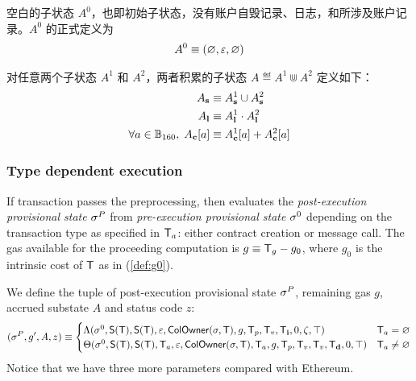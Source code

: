 空白的子状态 $A^0$，也即初始子状态，没有账户自毁记录、日志，和所涉及账户记录。$A^0$ 的正式定义为
\begin{align}
	A^0\equiv \left( \varnothing, \mathbb{\varepsilon}, \varnothing\right)
\end{align}

对任意两个子状态 $A^1$ 和 $A^2$，两者积累的子状态 $A\eqdef A^1\Cup A^2$ 定义如下：
\begin{align}
	A_{\bf s} &\equiv A^1_{\bf s} \cup A^2_{\bf s} \\ 
	A_{\bf l} &\equiv A^1_{\bf l} \cdot A^2_{\bf l} \\
	\forall a\in\mathbb{B}_{160},\; A_{\bf c}[a] & \equiv A^1_{\bf c}[a]+A^2_{\bf c}[a]
\end{align}


\subsubsection{Type dependent execution}

If transaction passes the preprocessing, 
then {\name} evaluates the \emph{post-execution provisional state} $\mathbf{\sigma}^P$ from \emph{pre-execution provisional state} $\mathbf{\sigma}^0$ depending on the transaction type as specified in $\textsf{T}_a$: either contract creation or message call. 
%
The gas available for the proceeding computation is $g\equiv \textsf{T}_g-g_0$, where $g_0$ is the intrinsic cost of $\textsf{T}$ as in (\ref{def:g0}). 

We define the tuple of post-execution provisional state $\mathbf{\sigma}^{P}$, remaining gas $g$, accrued substate $A$ and status code $z$:
\begin{align}\label{def:transform}
	(\mathbf{\sigma}^{P},g',A,z)\equiv
	\begin{cases}
		\mathrm{\Lambda}(\mathbf{\sigma}^0,\mathsf{S}{\left({\textsf{T}} \right)},\mathsf{S}{\left({\textsf{T}} \right)},\mathbb{\varepsilon}, \mathsf{ColOwner}(\mathbf{\sigma},\textsf{T}),g,\textsf{T}_p,\textsf{T}_v,\textsf{T}_{\bf i},0,\zeta,\top) &  \textsf{T}_a=\varnothing \\
		\mathrm{\Theta}(\mathbf{\sigma}^0,\mathsf{S}{\left({\textsf{T}} \right)},\mathsf{S}{\left({\textsf{T}} \right)},\textsf{T}_a,\mathbb{\varepsilon},\mathsf{ColOwner}(\mathbf{\sigma},\textsf{T}),\textsf{T}_a,g,\textsf{T}_p,\textsf{T}_v,\textsf{T}_v,\textsf{T}_{\bf d},0,\top) & \textsf{T}_a\neq\varnothing
	\end{cases}
\end{align}
%
Notice that we have three more parameters compared with Ethereum. 

